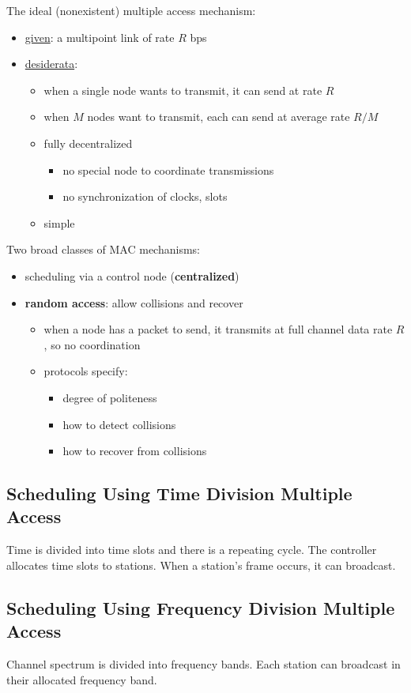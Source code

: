\documentclass[11pt]{article}
\begin{document}
The ideal (nonexistent) multiple access mechanism:
\begin{itemize}
\item \uline{given}: a multipoint link of rate \(R\) bps
\item \uline{desiderata}:
\begin{itemize}
\item when a single node wants to transmit, it can send at rate \(R\)
\item when \(M\) nodes want to transmit, each can send at average rate \(R/M\)
\item fully decentralized
\begin{itemize}
\item no special node to coordinate transmissions
\item no synchronization of clocks, slots
\end{itemize}
\item simple
\end{itemize}
\end{itemize}

Two broad classes of MAC mechanisms:
\begin{itemize}
\item scheduling via a control node (\textbf{centralized})
\item \textbf{random access}: allow collisions and recover
\begin{itemize}
\item when a node has a packet to send, it transmits at full channel data rate \(R\), so no coordination
\item protocols specify:
\begin{itemize}
\item degree of politeness
\item how to detect collisions
\item how to recover from collisions
\end{itemize}
\end{itemize}
\end{itemize}
\subsection{Scheduling Using Time Division Multiple Access}
\label{sec:org8891518}
Time is divided into time slots and there is a repeating cycle.
The controller allocates time slots to stations.
When a station's frame occurs, it can broadcast.
\subsection{Scheduling Using Frequency Division Multiple Access}
\label{sec:org1bfe788}
Channel spectrum is divided into frequency bands.
Each station can broadcast in their allocated frequency band.
\end{document}
